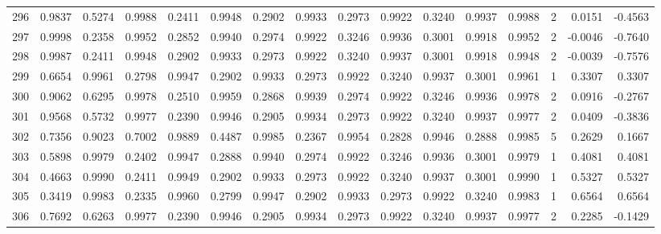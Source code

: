 \begin{tabular}{lrrrrrrrrrrrrrrr}
296 &      0.9837 &  0.5274 &  0.9988 &  0.2411 &  0.9948 &  0.2902 &  0.9933 &  0.2973 &  0.9922 &  0.3240 &   0.9937 &     0.9988 &      2 &                    0.0151 &                    -0.4563 \\
297 &      0.9998 &  0.2358 &  0.9952 &  0.2852 &  0.9940 &  0.2974 &  0.9922 &  0.3246 &  0.9936 &  0.3001 &   0.9918 &     0.9952 &      2 &                   -0.0046 &                    -0.7640 \\
298 &      0.9987 &  0.2411 &  0.9948 &  0.2902 &  0.9933 &  0.2973 &  0.9922 &  0.3240 &  0.9937 &  0.3001 &   0.9918 &     0.9948 &      2 &                   -0.0039 &                    -0.7576 \\
299 &      0.6654 &  0.9961 &  0.2798 &  0.9947 &  0.2902 &  0.9933 &  0.2973 &  0.9922 &  0.3240 &  0.9937 &   0.3001 &     0.9961 &      1 &                    0.3307 &                     0.3307 \\
300 &      0.9062 &  0.6295 &  0.9978 &  0.2510 &  0.9959 &  0.2868 &  0.9939 &  0.2974 &  0.9922 &  0.3246 &   0.9936 &     0.9978 &      2 &                    0.0916 &                    -0.2767 \\
301 &      0.9568 &  0.5732 &  0.9977 &  0.2390 &  0.9946 &  0.2905 &  0.9934 &  0.2973 &  0.9922 &  0.3240 &   0.9937 &     0.9977 &      2 &                    0.0409 &                    -0.3836 \\
302 &      0.7356 &  0.9023 &  0.7002 &  0.9889 &  0.4487 &  0.9985 &  0.2367 &  0.9954 &  0.2828 &  0.9946 &   0.2888 &     0.9985 &      5 &                    0.2629 &                     0.1667 \\
303 &      0.5898 &  0.9979 &  0.2402 &  0.9947 &  0.2888 &  0.9940 &  0.2974 &  0.9922 &  0.3246 &  0.9936 &   0.3001 &     0.9979 &      1 &                    0.4081 &                     0.4081 \\
304 &      0.4663 &  0.9990 &  0.2411 &  0.9949 &  0.2902 &  0.9933 &  0.2973 &  0.9922 &  0.3240 &  0.9937 &   0.3001 &     0.9990 &      1 &                    0.5327 &                     0.5327 \\
305 &      0.3419 &  0.9983 &  0.2335 &  0.9960 &  0.2799 &  0.9947 &  0.2902 &  0.9933 &  0.2973 &  0.9922 &   0.3240 &     0.9983 &      1 &                    0.6564 &                     0.6564 \\
306 &      0.7692 &  0.6263 &  0.9977 &  0.2390 &  0.9946 &  0.2905 &  0.9934 &  0.2973 &  0.9922 &  0.3240 &   0.9937 &     0.9977 &      2 &                    0.2285 &                    -0.1429 \\

\end{tabular}
